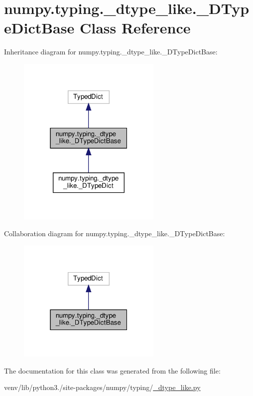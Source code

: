 \hypertarget{classnumpy_1_1typing_1_1__dtype__like_1_1__DTypeDictBase}{}\section{numpy.\+typing.\+\_\+dtype\+\_\+like.\+\_\+\+D\+Type\+Dict\+Base Class Reference}
\label{classnumpy_1_1typing_1_1__dtype__like_1_1__DTypeDictBase}


Inheritance diagram for numpy.\+typing.\+\_\+dtype\+\_\+like.\+\_\+\+D\+Type\+Dict\+Base\+:
\nopagebreak
\begin{figure}[H]
\begin{center}
\leavevmode
\includegraphics[width=195pt]{classnumpy_1_1typing_1_1__dtype__like_1_1__DTypeDictBase__inherit__graph}
\end{center}
\end{figure}


Collaboration diagram for numpy.\+typing.\+\_\+dtype\+\_\+like.\+\_\+\+D\+Type\+Dict\+Base\+:
\nopagebreak
\begin{figure}[H]
\begin{center}
\leavevmode
\includegraphics[width=195pt]{classnumpy_1_1typing_1_1__dtype__like_1_1__DTypeDictBase__coll__graph}
\end{center}
\end{figure}


The documentation for this class was generated from the following file\+:\begin{DoxyCompactItemize}
\item 
venv/lib/python3./site-\/packages/numpy/typing/\hyperlink{__dtype__like_8py}{\+\_\+dtype\+\_\+like.\+py}\end{DoxyCompactItemize}
